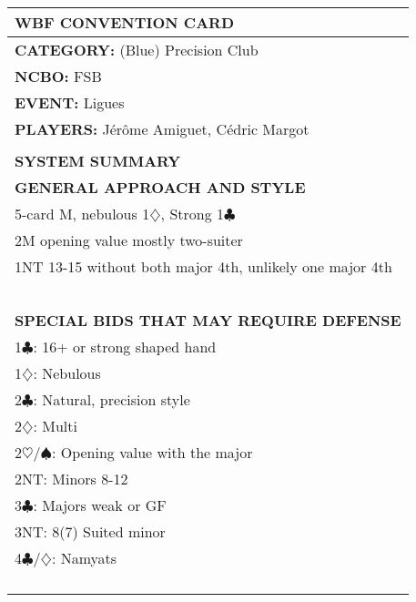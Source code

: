 \documentclass{article}
\newcommand\C{\ensuremath{\clubsuit}}
\newcommand\D{\ensuremath{\diamondsuit}}
\renewcommand\H{\ensuremath{\heartsuit}}
\renewcommand\S{\ensuremath{\spadesuit}}
\begin{document}
\begin{minipage}{5mm}
	\begin{tabular}{| p{5mm} |}
	\end{tabular}
\end{minipage}
\begin{minipage}{90mm}
	\begin{tabular}{| p{88mm} |}
		\hline
		\cellcolor[gray]{0.9} \textbf{WBF CONVENTION CARD} \\ \hline
		\textbf{CATEGORY:} (Blue) Precision Club\\
		\textbf{NCBO:} FSB\\
		\textbf{EVENT:} Ligues\\
		\textbf{PLAYERS:} J\'er\^ome Amiguet, C\'edric Margot \\
		\multirow{2}{*}{} \\
		\\
		\cellcolor[gray]{0.9} \textbf{SYSTEM SUMMARY} \\ \hline
		\textbf{GENERAL APPROACH AND STYLE} \\ \hline
		5-card M, nebulous 1\D, Strong 1\C\\ \hline
		2M opening value mostly two-suiter\\ \hline
		1NT 13-15 without both major 4th, unlikely one major 4th\\ \hline
		\\ \hline
		\\ \hline
		\\ \hline
		\\ \hline
		\\ \hline
		\textbf{SPECIAL BIDS THAT MAY REQUIRE DEFENSE} \\ \hline
		1\C: 16+ or strong shaped hand\\ \hline
		1\D: Nebulous\\ \hline
		2\C: Natural, precision style\\ \hline
		2\D: Multi\\ \hline
		2\H/\S: Opening value with the major\\ \hline
		2NT: Minors 8-12\\ \hline
		3\C: Majors weak or GF\\ \hline
		3NT: 8(7) Suited minor\\ \hline
		4\C/\D: Namyats\\ \hline
		\\ \hline
		\\ \hline
		\\ \hline
		\\ \hline

\end{tabular}
\end{minipage}
\end{document}
